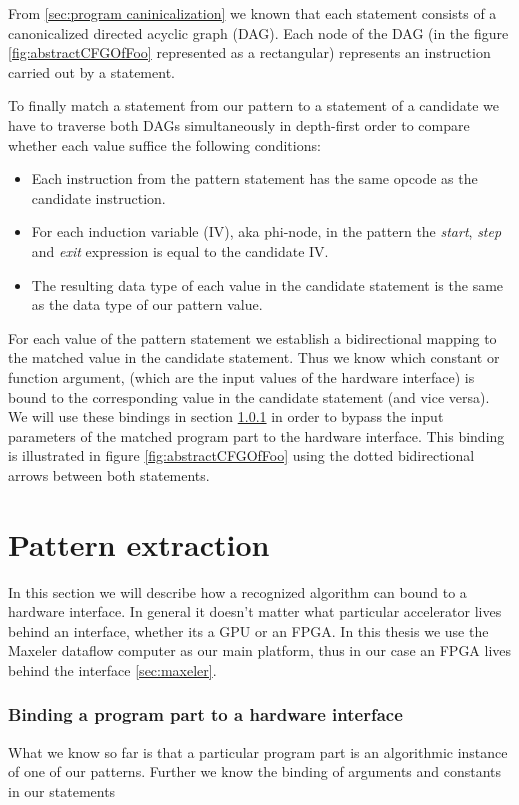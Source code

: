 From \ref{sec:program caninicalization} we known that each statement consists of a canonicalized directed acyclic graph (DAG). Each node of the DAG (in the figure \ref{fig:abstractCFGOfFoo} represented as a rectangular) represents an instruction carried out by a statement.

To finally match a statement from our pattern to a statement of a candidate we have to traverse both DAGs simultaneously in depth-first order to compare whether each value suffice the following conditions:
\begin{itemize}
\item Each instruction from the pattern statement has the same opcode as the candidate instruction.
\item For each induction variable (IV), aka phi-node, in the pattern the \textit{start}, \textit{step} and \textit{exit} expression is equal to the candidate IV.
\item The resulting data type of each value in the candidate statement is the same as the data type of our pattern value.
\end{itemize}

For each value of the pattern statement we establish a bidirectional mapping to the matched value in the candidate statement. Thus we know which constant or function argument, (which are the input values of the hardware interface) is bound to the corresponding value in the candidate statement (and vice versa). We will use these bindings in section \ref{sec:hw_iface_binding} in order to bypass the input parameters of the matched program part to the hardware interface. This binding is illustrated in figure \ref{fig:abstractCFGOfFoo} using the dotted bidirectional arrows between both statements.

\section{Pattern extraction}

In this section we will describe how a recognized algorithm can bound to a hardware interface. In general it doesn't matter what particular accelerator lives behind an interface, whether its a GPU or an FPGA. In this thesis we use the Maxeler dataflow computer as our main platform, thus in our case an FPGA lives behind the interface \ref{sec:maxeler}.


\subsubsection{Binding a program part to a hardware interface}
\label{sec:hw_iface_binding}

What we know so far is that a particular program part is an algorithmic instance of one of our patterns. Further we know the binding of arguments and constants in our statements
